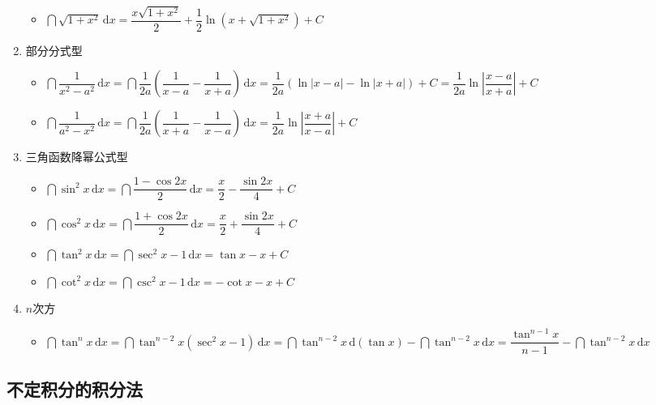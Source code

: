 \documentclass[../book.tex]{subfiles}
\begin{document}
\begin{enumerate}
\begin{itemize}
\begin{circlenum}
            \end{circlenum}
            \item $\dint \sqrt{1+x^2}\,\mathrm{d}x = \dfrac{x\sqrt{1+x^2}}{2} + \dfrac{1}{2}\ln\!\left(x+\sqrt{1+x^2}\right) + C$
        \end{itemize}
        \item 部分分式{\color{red}{分解}}型
        \begin{itemize}
            \item $\dint \dfrac{1}{x^2 - a^2}\,\mathrm{d}x = \dint \dfrac{1}{2a}(\dfrac{1}{x-a} - \dfrac{1}{x+a})\,\mathrm{d}x = \dfrac{1}{2a}(\ln|x - a| - \ln|x + a|) + C = \dfrac{1}{2a}\ln \left|\dfrac{x-a}{x+a}\right| + C$
            \item $\dint \dfrac{1}{a^2 - x^2}\,\mathrm{d}x = \dint \dfrac{1}{2a}(\dfrac{1}{x + a} - \dfrac{1}{x - a})\,\mathrm{d}x = \dfrac{1}{2a}\ln \left|\dfrac{x+a}{x-a}\right| + C$
        \end{itemize}
        \item 三角函数降幂公式型
        \begin{itemize}
            \item $\dint \sin^2 x\,\mathrm{d}x = \dint \dfrac{1-\cos 2x}{2}\,\mathrm{d}x = \dfrac{x}{2} - \dfrac{\sin 2x}{4} + C$
            \item $\dint \cos^2 x\,\mathrm{d}x = \dint \dfrac{1+\cos 2x}{2}\,\mathrm{d}x = \dfrac{x}{2} + \dfrac{\sin 2x}{4} + C$
            \item $\dint \tan^2 x\,\mathrm{d}x = \dint \sec^2 x - 1\,\mathrm{d}x = \tan x - x + C$
            \item $\dint \cot^2 x\,\mathrm{d}x = \dint \csc^2 x - 1\,\mathrm{d}x = -\cot x - x + C$
        \end{itemize}
        \item $n$次方
        \begin{itemize}
            \item $\dint \tan^n x\,\mathrm{d}x = \dint \tan^{n-2} x(\sec^2 x - 1)\,\mathrm{d}x = \dint \tan^{n-2} x\,\mathrm{d}(\tan x) - \dint \tan^{n-2} x\,\mathrm{d}x = \dfrac{\tan^{n-1} x}{n - 1} - \dint \tan^{n-2} x\,\mathrm{d}x$
        \end{itemize}
    \end{enumerate}

    \subsection{不定积分的积分法}
\end{document}
